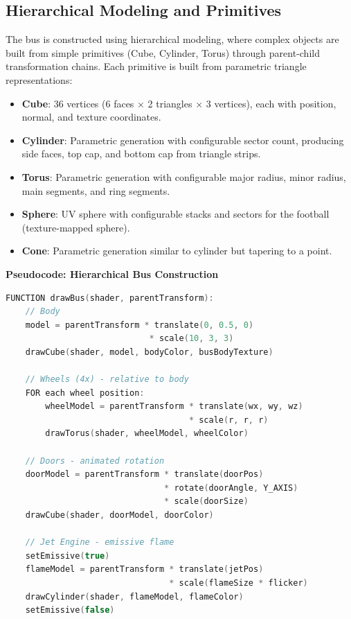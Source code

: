 \documentclass[12pt,a4paper]{article}
\begin{document}
\subsection{Hierarchical Modeling and Primitives}

The bus is constructed using hierarchical modeling, where complex objects are built from simple primitives (Cube, Cylinder, Torus) through parent-child transformation chains. Each primitive is built from parametric triangle representations:

\begin{itemize}
    \item \textbf{Cube}: 36 vertices (6 faces $\times$ 2 triangles $\times$ 3 vertices), each with position, normal, and texture coordinates.
    \item \textbf{Cylinder}: Parametric generation with configurable sector count, producing side faces, top cap, and bottom cap from triangle strips.
    \item \textbf{Torus}: Parametric generation with configurable major radius, minor radius, main segments, and ring segments.
    \item \textbf{Sphere}: UV sphere with configurable stacks and sectors for the football (texture-mapped sphere).
    \item \textbf{Cone}: Parametric generation similar to cylinder but tapering to a point.
\end{itemize}

\textbf{Pseudocode: Hierarchical Bus Construction}
\begin{lstlisting}[language=C++, caption={Hierarchical Bus Drawing}]
FUNCTION drawBus(shader, parentTransform):
    // Body
    model = parentTransform * translate(0, 0.5, 0)
                             * scale(10, 3, 3)
    drawCube(shader, model, bodyColor, busBodyTexture)

    // Wheels (4x) - relative to body
    FOR each wheel position:
        wheelModel = parentTransform * translate(wx, wy, wz)
                                     * scale(r, r, r)
        drawTorus(shader, wheelModel, wheelColor)

    // Doors - animated rotation
    doorModel = parentTransform * translate(doorPos)
                                * rotate(doorAngle, Y_AXIS)
                                * scale(doorSize)
    drawCube(shader, doorModel, doorColor)

    // Jet Engine - emissive flame
    setEmissive(true)
    flameModel = parentTransform * translate(jetPos)
                                 * scale(flameSize * flicker)
    drawCylinder(shader, flameModel, flameColor)
    setEmissive(false)
\end{lstlisting}
\end{document}
